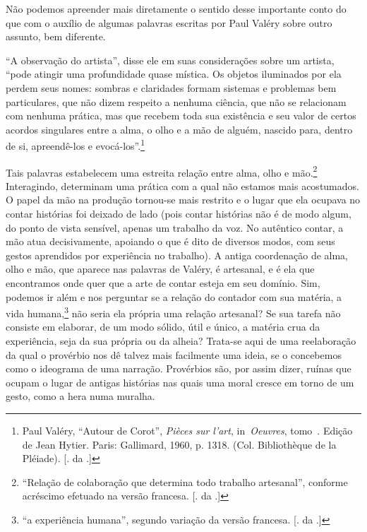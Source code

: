 Não podemos apreender mais diretamente o sentido desse importante conto
do que com o auxílio de algumas palavras escritas por Paul Valéry sobre
outro assunto, bem diferente.

``A observação do artista'', disse ele em suas considerações sobre um
artista, ``pode atingir uma profundidade quase mística. Os objetos
iluminados por ela perdem seus nomes: sombras e claridades formam
sistemas e problemas bem particulares, que não dizem respeito a nenhuma
ciência, que não se relacionam com nenhuma prática, mas que recebem toda
sua existência e seu valor de certos acordos singulares entre a alma, o
olho e a mão de alguém, nascido para, dentro de si, apreendê-los e
evocá-los''.\footnote{Paul Valéry, ``Autour de Corot'', \emph{Pièces sur
  l'art}, in~\emph{Oeuvres}, tomo~. Edição de Jean Hytier. Paris:
  Gallimard, 1960, p. 1318. (Col. Bibliothèque de la Pléiade). [. da
  .]}

Tais palavras estabelecem uma estreita relação entre alma, olho e
mão.\footnote{``Relação de colaboração que determina todo trabalho
  artesanal'', conforme acréscimo efetuado na versão francesa. [. da
  .]} Interagindo, determinam uma prática com a qual não estamos mais
acostumados. O papel da mão na produção tornou-se mais restrito e o
lugar que ela ocupava no contar histórias foi deixado de lado (pois
contar histórias não é de modo algum, do ponto de vista sensível, apenas
um trabalho da voz. No autêntico contar, a mão atua decisivamente,
apoiando o que é dito de diversos modos, com seus gestos aprendidos por
experiência no trabalho). A antiga coordenação de alma, olho e mão, que
aparece nas palavras de Valéry, é artesanal, e é ela que encontramos
onde quer que a arte de contar esteja em seu domínio. Sim, podemos ir
além e nos perguntar se a relação do contador com sua matéria, a vida
humana,\footnote{``a experiência humana'', segundo variação da versão
  francesa. [. da .]} não seria ela própria uma relação
artesanal? Se sua tarefa não consiste em elaborar, de um modo sólido,
útil e único, a matéria crua da experiência, seja da sua própria ou da
alheia? Trata-se aqui de uma reelaboração da qual o provérbio nos dê
talvez mais facilmente uma ideia, se o concebemos como o ideograma de
uma narração. Provérbios são, por assim dizer, ruínas que ocupam o lugar
de antigas histórias nas quais uma moral cresce em torno de um gesto,
como a hera numa muralha.

